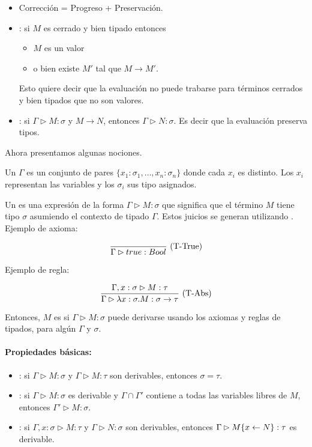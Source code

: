 \begin{itemize}
  \item Corrección = Progreso + Preservación.
  \item {}: si $M$ es cerrado y bien tipado entonces
    \begin{itemize}
      \item $M$ es un valor
      \item o bien existe $M'$ tal que $M \to M'$.
    \end{itemize}
    Esto quiere decir que la evaluación no puede trabarse para términos cerrados y bien tipados que no son valores.
  \item {}: si $\Gamma \rhd M : \sigma$ y $M \to N$, entonces $\Gamma \rhd N : \sigma$. Es decir que la evaluación preserva tipos.
\end{itemize}

Ahora presentamos algunas nociones.

Un  $\Gamma$ es un conjunto de pares $\{x_1:\sigma_1,\dots,x_n:\sigma_n\}$ donde cada $x_i$ es distinto. Los $x_i$ representan las variables y los $\sigma_i$ sus tipo asignados.

Un  es una expresión de la forma $\Gamma \rhd M : \sigma$ que significa que el término $M$ tiene tipo $\sigma$ asumiendo el contexto de tipado $\Gamma$. Estos juicios se generan utilizando . Ejemplo de axioma:

\[\frac{}{\Gamma \rhd true : Bool}\ \text{(T-True)}\]

Ejemplo de regla:

\[\frac{\Gamma, x : \sigma \rhd M : \tau}{\Gamma \rhd \lambda x:\sigma.M:\sigma\to\tau}\ \text{(T-Abs)}\]

\vspace{0.5em}
Entonces, $M$ es   si $\Gamma \rhd M : \sigma$ puede derivarse usando los axiomas y reglas de tipados, para algún $\Gamma$ y $\sigma$.

\paragraph{Propiedades básicas:}

\begin{itemize}
  \item {}: si $\Gamma \rhd M : \sigma$ y $\Gamma \rhd M : \tau$ son derivables, entonces $\sigma = \tau$.
  \item {}: si $\Gamma \rhd M : \sigma$ es derivable y $\Gamma \cap \Gamma'$ contiene a todas las variables libres de $M$, entonces $\Gamma' \rhd M : \sigma$.
  \item {}: si $\Gamma,x:\sigma \rhd M : \tau$ y $\Gamma \rhd N : \sigma$ son derivables, entonces $\Gamma \rhd M\{x\leftarrow N\} : \tau$ es derivable.
\end{itemize}

